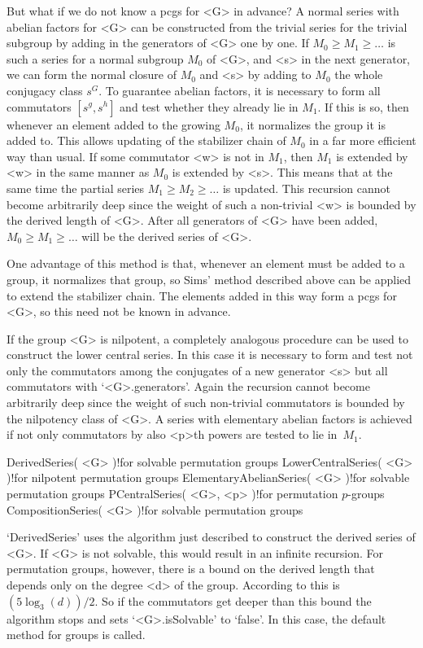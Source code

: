 But what  if we do not  know a pcgs for  <G> in advance? A  normal series
with abelian factors for  <G> can be constructed  from the trivial series
for the trivial subgroup by adding  in the generators  of <G> one by one.
If $M_0 \ge M_1 \ge \ldots$ is such a series for  a normal subgroup $M_0$
of <G>, and <s> in the next generator, we can  form the normal closure of
$M_0$ and <s> by   adding to $M_0$   the whole conjugacy class $s^G$.  To
guarantee abelian   factors, it  is  necessary  to form   all commutators
$[s^g,s^h]$ and  test whether they  already lie in  $M_1$. If this is so,
then  whenever an element  added to the growing  $M_0$, it normalizes the
group it is added  to. This allows updating  of  the stabilizer chain  of
$M_0$ in a far more  efficient way than  usual. If some commutator <w> is
not in $M_1$, then $M_1$ is extended by  <w> in the  same manner as $M_0$
is extended by <s>. This  means that at the  same time the partial series
$M_1  \ge M_2  \ge \ldots$   is updated.  This  recursion cannot   become
arbitrarily deep since the weight of such a non-trivial <w> is bounded by
the derived  length of <G>. After all  generators of <G> have been added,
$M_0 \ge M_1 \ge \ldots$ will be the derived series of <G>.

One advantage of this  method is that, whenever an  element must be added
to a group, it normalizes that group, so Sims' method described above can
be applied to extend the stabilizer chain. The elements added in this way
form a pcgs for <G>, so this need not be known in advance.

If  the group <G> is  nilpotent, a completely  analogous procedure can be
used to construct the lower central series. In  this case it is necessary
to form and test not only  the commutators among  the conjugates of a new
generator  <s> but  all   commutators  with `<G>.generators'.  Again  the
recursion  cannot become  arbitrarily   deep  since the  weight   of such
non-trivial commutators  is bounded by  the nilpotency  class  of <G>.  A
series  with    elementary abelian   factors   is achieved   if not  only
commutators by also <p>th powers are tested to lie in~$M_1$.

\>DerivedSeries( <G> )!{for solvable permutation groups}
\>LowerCentralSeries( <G> )!{for nilpotent permutation groups}
\>ElementaryAbelianSeries( <G> )!{for solvable permutation groups}
\>PCentralSeries( <G>, <p> )!{for permutation $p$-groups}
\>CompositionSeries( <G> )!{for solvable permutation groups}

`DerivedSeries'  uses the algorithm    just  described to  construct  the
derived series of <G>.  If <G> is  not solvable, this  would result in an
infinite recursion. For permutation groups,  however, there is a bound on
the derived length  that  depends only on   the degree <d> of  the group.
According   to   \cite{Dix68} this  is  $(5    \log_3(d))/2$.  So if  the
commutators  get  deeper than this  bound  the  algorithm stops  and sets
`<G>.isSolvable' to `false'. In this case, the  default method for groups
is called.

